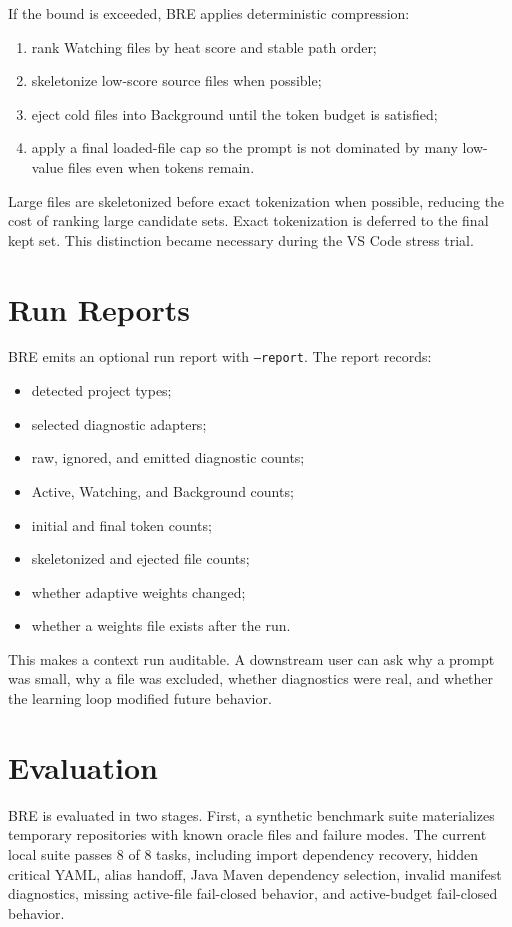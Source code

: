 \documentclass[10pt,twocolumn,letterpaper]{article}
\begin{document}
If the bound is exceeded, BRE applies deterministic compression:
\begin{enumerate}
    \item rank Watching files by heat score and stable path order;
    \item skeletonize low-score source files when possible;
    \item eject cold files into Background until the token budget is satisfied;
    \item apply a final loaded-file cap so the prompt is not dominated by many low-value files even when tokens remain.
\end{enumerate}

Large files are skeletonized before exact tokenization when possible, reducing the cost of ranking large candidate sets. Exact tokenization is deferred to the final kept set. This distinction became necessary during the VS Code stress trial.

\section{Run Reports}
BRE emits an optional run report with \texttt{--report}. The report records:
\begin{itemize}
    \item detected project types;
    \item selected diagnostic adapters;
    \item raw, ignored, and emitted diagnostic counts;
    \item Active, Watching, and Background counts;
    \item initial and final token counts;
    \item skeletonized and ejected file counts;
    \item whether adaptive weights changed;
    \item whether a weights file exists after the run.
\end{itemize}

This makes a context run auditable. A downstream user can ask why a prompt was small, why a file was excluded, whether diagnostics were real, and whether the learning loop modified future behavior.

\section{Evaluation}
BRE is evaluated in two stages. First, a synthetic benchmark suite materializes temporary repositories with known oracle files and failure modes. The current local suite passes 8 of 8 tasks, including import dependency recovery, hidden critical YAML, alias handoff, Java Maven dependency selection, invalid manifest diagnostics, missing active-file fail-closed behavior, and active-budget fail-closed behavior.
\end{document}
